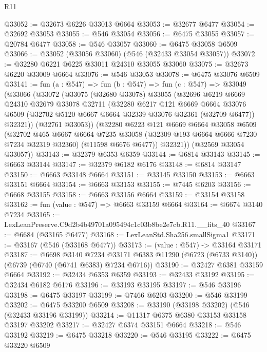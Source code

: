 \begin{lexlean}{R11}
\begin{coremodule}
@33052 := @32673 @6226 @33013 @6664
@33053 := @32677 @6477
@33054 := @32692 @33053
@33055 := @546 @33054
@33056 := @6475 @33055
@33057 := @20784 @6477
@33058 := @546 @33057
@33060 := @6475 @33058 @6509
@33066 := @33052 (@33056 @33060) (@546 (@32433 @33054 @33057))
@33072 := @32280 @6221 @6225 @33011 @24310 @33055 @33060
@33075 := @32673 @6220 @33009 @6664
@33076 := @546 @33053
@33078 := @6475 @33076 @6509
@33141 := fun (a : @547) =>
  fun (b : @547) =>
  fun (c : @547) =>
  @33049
    (@33066
      (@33072
        (@33075
          (@32680 @33078)
          @33055
          (@32696
            @6219
            @6669
            @24310
            @32679
            @33078
            @32711
            (@32280
              @6217
              @121
              @6669
              @6664
              @33076
              @6509
              (@32702 @5120 @6667 @6664 @32339 @33076 @32361 (@32709 @6477))
              @32321))
          (@32761 @33053))
        (@32280
          @6223
          @121
          @6669
          @6664
          @33058
          @6509
          (@32702
            @465
            @6667
            @6664
            @7235
            @33058
            (@32309 @193 @6664 @6666 @7230 @7234 @32319 @32360)
            (@11598 @6676 @6477))
          @32321))
      (@32569 @33054 @33057))
@33143 := @32379 @6353 @6359
@33144 := @6814 @33143
@33145 := @6663 @33144
@33147 := @32379 @6182 @6176
@33148 := @6814 @33147
@33150 := @6663 @33148 @6664
@33151 := @33145 @33150
@33153 := @6663 @33151 @6664
@33154 := @6663 @33153
@33155 := @7445 @6203
@33156 := @6668 @33155
@33158 := @6663 @33156 @6664
@33159 := @33154 @33158
@33162 := fun (value : @547) => @6663 @33159 @6664
@33164 := @6674 @3140 @7234
@33165 := LexLeanPreserve.C9d2b4b49701a095494c1c03b8be2e7cb.R11.__fits_40
@33167 := @6684 (@33165 @6477)
@33168 := LexLeanStd.Sha256.smallSigma1
@33171 := @33167 (@546 (@33168 @6477))
@33173 := (value : @547) -> @33164 @33171
@33187 := @6698
    @3140
    @7234
    @33171
    @6383
    @11290
    (@6723 (@6733 @3140))
    (@6739 (@6740 (@6741 @6383) @7234 @6716))
@33190 := @32427 @6381 @33159 @6664
@33192 := @32434 @6353 @6359
@33193 := @32433 @33192
@33195 := @32434 @6182 @6176
@33196 := @33193 @33195
@33197 := @546 @33196
@33198 := @6475 @33197
@33199 := @7466 @6203
@33200 := @546 @33199
@33202 := @6475 @33200 @6509
@33208 := @33190 (@33198 @33202) (@546 (@32433 @33196 @33199))
@33214 := @11317 @6375 @6380 @33153 @33158 @33197 @33202
@33217 := @32427 @6374 @33151 @6664
@33218 := @546 @33192
@33219 := @6475 @33218
@33220 := @546 @33195
@33222 := @6475 @33220 @6509

\end{coremodule}
\end{lexlean}
